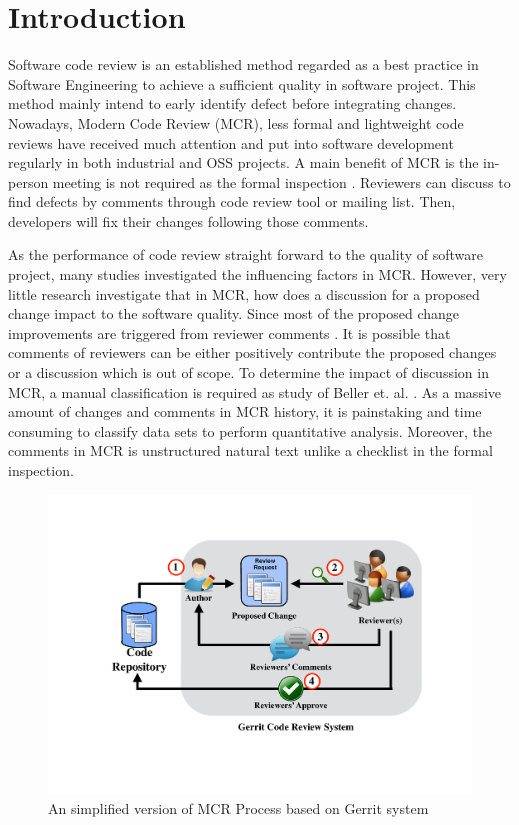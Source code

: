 \documentclass[conference]{IEEEtran}
\begin{document}
\section{Introduction}
Software code review is an established method regarded as a best practice in Software Engineering to achieve a sufficient quality in software project. This method mainly intend to early identify defect before integrating changes. Nowadays, Modern Code Review (MCR)\cite{Bacchelli2013a}, less formal and lightweight code reviews have received much attention and  put into software development regularly in both industrial and OSS projects. A main benefit of MCR is the in-person meeting is not required as the formal inspection \cite{Fagan:1976:DCI:1661010.1661012}. Reviewers can discuss to find defects by comments through code review tool or mailing list. Then, developers will fix their changes following those comments.

As the performance of code review straight forward to the quality of software project, many studies investigated the influencing factors in MCR\cite{Baysal2001,Mcintosh,Beller,Hamasaki2013}. However, very little research investigate that in MCR, how does a discussion for a proposed change impact to the software quality. Since most of the proposed change improvements are triggered from reviewer comments \cite{Beller}. 
It is possible that comments of reviewers can be either positively contribute the proposed changes or a discussion which is out of scope.
To determine the impact of discussion in MCR, a manual classification is required as study of Beller et. al. \cite{Beller}. As a massive amount of changes and comments in MCR history\cite{Balachandran2013,Thongtanunam2014}, it is painstaking and time consuming to classify data sets to perform quantitative analysis. Moreover, the comments in MCR is unstructured natural text unlike a checklist in the formal inspection. 
\begin{figure}[!t]
\centering
\includegraphics[scale=0.35, trim= 100 110 50 80, clip=true]{review_process}
\caption{An simplified version of MCR Process based on Gerrit system}
\label{fig:process}
\end{figure}
\end{document}
